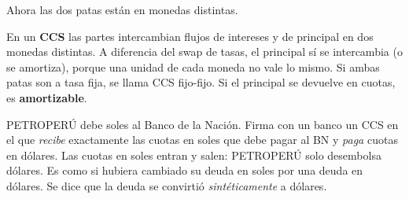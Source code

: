 Ahora las dos patas están en monedas distintas.

\begin{definicion}
En un \textbf{CCS} las partes intercambian flujos de intereses y de principal en dos monedas distintas. A diferencia del swap de tasas, el principal sí se intercambia (o se amortiza), porque una unidad de cada moneda no vale lo mismo. Si ambas patas son a tasa fija, se llama CCS fijo-fijo. Si el principal se devuelve en cuotas, es \textbf{amortizable}.
\end{definicion}

\begin{intuicion}
PETROPERÚ debe soles al Banco de la Nación. Firma con un banco un CCS en el que \emph{recibe} exactamente las cuotas en soles que debe pagar al BN y \emph{paga} cuotas en dólares. Las cuotas en soles entran y salen: PETROPERÚ solo desembolsa dólares. Es como si hubiera cambiado su deuda en soles por una deuda en dólares. Se dice que la deuda se convirtió \emph{sintéticamente} a dólares.
\end{intuicion}

